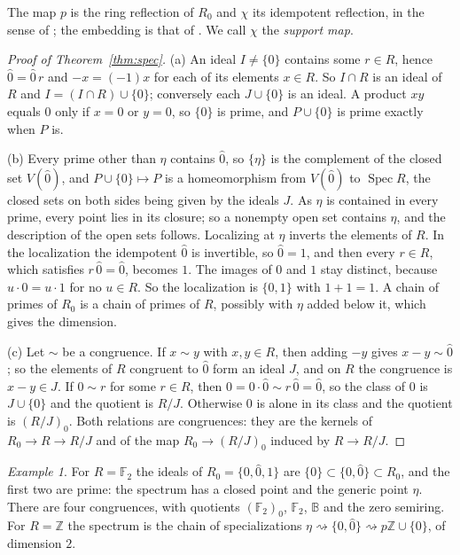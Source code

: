 \documentclass[11pt]{amsart}
\theoremstyle{remark}
\newtheorem{example}[thm]{Example}
\newcommand{\B}{\mathbb B}
\newcommand{\oz}{\widehat{0}}
\DeclareMathOperator{\Spec}{Spec}
\begin{document}
The map $p$ is the ring reflection of $R_0$ and $\chi$ its idempotent reflection, in the sense of \cite[Proposition 4.13]{FGJM}; the embedding is that of \cite[Theorem 7.2]{FGJM}. We call $\chi$ the \emph{support map}.

\begin{proof}[Proof of Theorem~\ref{thm:spec}]
(a) An ideal $I\ne\{0\}$ contains some $r\in R$, hence $\oz=\oz\,r$ and $-x=(-1)x$ for each of its elements $x\in R$. So $I\cap R$ is an ideal of $R$ and $I=(I\cap R)\cup\{0\}$; conversely each $J\cup\{0\}$ is an ideal. A product $xy$ equals $0$ only if $x=0$ or $y=0$, so $\{0\}$ is prime, and $P\cup\{0\}$ is prime exactly when $P$ is.

(b) Every prime other than $\eta$ contains $\oz$, so $\{\eta\}$ is the complement of the closed set $V(\oz)$, and $P\cup\{0\}\mapsto P$ is a homeomorphism from $V(\oz)$ to $\Spec R$, the closed sets on both sides being given by the ideals $J$. As $\eta$ is contained in every prime, every point lies in its closure; so a nonempty open set contains $\eta$, and the description of the open sets follows. Localizing at $\eta$ inverts the elements of $R$. In the localization the idempotent $\oz$ is invertible, so $\oz=1$, and then every $r\in R$, which satisfies $r\,\oz=\oz$, becomes $1$. The images of $0$ and $1$ stay distinct, because $u\cdot0=u\cdot1$ for no $u\in R$. So the localization is $\{0,1\}$ with $1+1=1$. A chain of primes of $R_0$ is a chain of primes of $R$, possibly with $\eta$ added below it, which gives the dimension.

(c) Let $\sim$ be a congruence. If $x\sim y$ with $x,y\in R$, then adding $-y$ gives $x-y\sim\oz$; so the elements of $R$ congruent to $\oz$ form an ideal $J$, and on $R$ the congruence is $x-y\in J$. If $0\sim r$ for some $r\in R$, then $0=0\cdot\oz\sim r\,\oz=\oz$, so the class of $0$ is $J\cup\{0\}$ and the quotient is $R/J$. Otherwise $0$ is alone in its class and the quotient is $(R/J)_0$. Both relations are congruences: they are the kernels of $R_0\to R\to R/J$ and of the map $R_0\to(R/J)_0$ induced by $R\to R/J$.
\end{proof}

\begin{example}
For $R=\mathbb F_2$ the ideals of $R_0=\{0,\oz,1\}$ are $\{0\}\subset\{0,\oz\}\subset R_0$, and the first two are prime: the spectrum has a closed point and the generic point $\eta$. There are four congruences, with quotients $(\mathbb F_2)_0$, $\mathbb F_2$, $\B$ and the zero semiring. For $R=\mathbb Z$ the spectrum is the chain of specializations $\eta\rightsquigarrow\{0,\oz\}\rightsquigarrow p\mathbb Z\cup\{0\}$, of dimension $2$.
\end{example}
\end{document}
